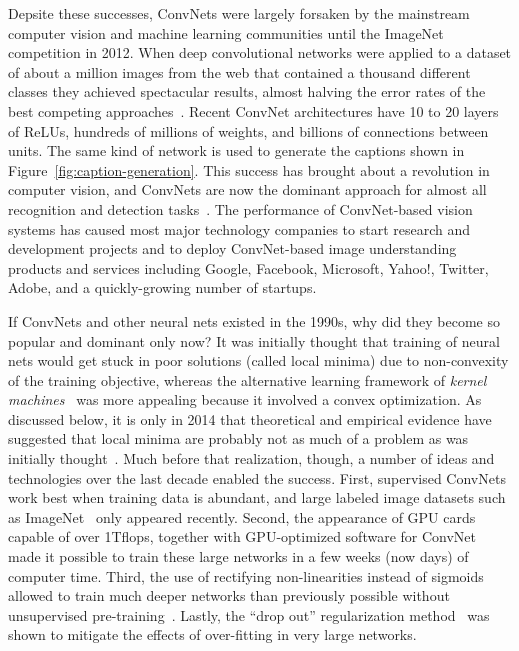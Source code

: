 \documentclass[10pts]{article}
\begin{document}
Depsite these successes, ConvNets were largely forsaken by the
mainstream computer vision and machine learning communities until the
ImageNet competition in 2012.  When deep convolutional networks were
applied to a dataset of about a million images from the web that
contained a thousand different classes they achieved spectacular
results, almost halving the error rates of the best competing
approaches~\citep{Krizhevsky-2012-small}.  Recent ConvNet
architectures have 10 to 20 layers of ReLUs, hundreds of millions of
weights, and billions of connections between units. The same kind of
network is used to generate the captions shown in
Figure~\ref{fig:caption-generation}. This success has brought about a
revolution in computer vision, and ConvNets are now the dominant
approach for almost all recognition and detection
tasks~\citep{sermanet-iclr-14,girshick-cvpr-2014,taigman-cvpr-2014,simonyan-arxiv-2014,szegedy-2014,Tompson-et-al-arxiv2014}.
The performance of ConvNet-based vision systems has caused most major
technology companies to start research and development projects and to
deploy ConvNet-based image understanding products and services
including Google, Facebook, Microsoft, Yahoo!, Twitter, Adobe, and a
quickly-growing number of startups.

If ConvNets and other neural nets existed in the 1990s, why did they become so popular and
dominant only now? It was initially thought that training of neural nets
would get stuck in poor solutions (called local minima) due to non-convexity
of the training objective, whereas the alternative learning framework
of {\em kernel machines}~\citep{Scholkopf+Smola-2002book} was more appealing
because it involved a convex optimization. As discussed below, it is only
in 2014 that theoretical and empirical evidence have suggested that local
minima are probably not as much of a problem as was initially 
thought~\citep{Dauphin-et-al-NIPS2014-small,Choromanska-et-al-AISTATS2015}.
Much before that realization, though, a number of 
ideas and technologies over the last decade enabled the success. 
First, supervised ConvNets work best
when training data is abundant, and large labeled image datasets such
as ImageNet~\citep{imagenet_cvpr09} only appeared recently. Second,
the appearance of GPU cards capable of over 1Tflops, together with
GPU-optimized software for ConvNet made it possible to train these
large networks in a few weeks (now days) of computer time. Third, the
use of rectifying non-linearities instead of sigmoids allowed to train
much deeper networks than previously possible without unsupervised
pre-training~\cite{jarrett-iccv-09,Glorot+al-AI-2011-small}. Lastly,
the ``drop out'' regularization method~\citep{Srivastava14} was shown
to mitigate the effects of over-fitting in very large networks. 
\end{document}
